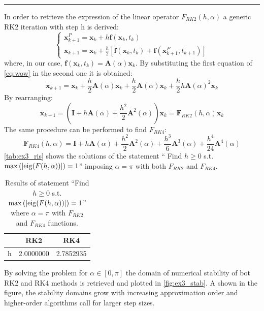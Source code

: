 \documentclass[11pt,a4paper,oneside]{article}
\renewcommand{\vec}[1]{\mathbf{#1}}
\begin{document}
\medskip \hrule \medskip

In order to retrieve the expression of the linear operator $F_{RK2}(h,\alpha)$ a generic RK2 iteration with step h is derived:
\begin{equation}
    \begin{cases}
        \vec{x}_{k+1}^P = \vec{x}_k + h\vec{f}(\vec{x}_k, t_k)\\
        \vec{x}_{k+1} = \vec{x}_k + \frac{h}{2}[\vec{f}(\vec{x}_k,t_k)+\vec{f}(\vec{x}_{k+1}^P, t_{k+1})]
    \end{cases}
    \label{eq:wow}
\end{equation}
where, in our case, $\vec{f}(\vec{x}_k, t_k) = \vec{A}(\alpha)\vec{x}_k$. By substituting the 
first equation of \autoref{eq:wow} in the second one it is obtained:
\begin{equation}
    \vec{x}_{k+1} = \vec{x}_k + \frac{h}{2}\vec{A}(\alpha)\vec{x}_k + \frac{h}{2}\vec{A}(\alpha)\vec{x}_k + \frac{h}{2}h\vec{A}(\alpha)^2\vec{x}_k
\end{equation}
By rearranging:
\begin{equation}
    \vec{x}_{k+1} = (\vec{I} + h\vec{A}(\alpha) + \frac{h^2}{2}\vec{A}^2(\alpha))\vec{x}_k = \vec{F}_{RK2}(h,\alpha)\vec{x}_k
\end{equation}
The same procedure can be performed to find $F_{RK4}$:
\begin{equation}
    \vec{F}_{RK4}(h,\alpha) = \vec{I} + h\vec{A}(\alpha) + \frac{h^2}{2}\vec{A}^2(\alpha) +  \frac{h^3}{6}\vec{A}^3(\alpha) + \frac{h^4}{24}\vec{A}^4(\alpha)
\end{equation}
\autoref{tab:ex3_ris} shows the solutions of the statement ``
Find $h\ge 0$ s.t.$\max\left(|{\rm eig}(F(h,\alpha))|\right) = 1$'' 
imposing $\alpha=\pi$ with both $F_{RK2}$ and $F_{RK4}$.
\begin{table}[h]
    \centering
    \begin{tabular}{l | c c}
         & $\vec{RK2}$ &  $\vec{RK4}$\\
        \midrule \midrule
        h & 2.0000000 & 2.7852935
    \end{tabular}
    \caption{Results of statement ``Find $h\ge 0$ s.t.$\max\left(|{\rm eig}(F(h,\alpha))|\right) = 1$'' where  $\alpha=\pi$ with $F_{RK2}$ and $F_{RK4}$ functions.}
    \label{tab:ex3_ris}
\end{table}

By solving the problem for $\alpha\in[0, \pi]$ the domain of numerical stability of bot RK2 
and RK4 methods is retrieved and plotted in \autoref{fig:ex3_stab}. A shown in the figure, 
the stability domains grow with increasing approximation order and higher-order algorithms 
call for larger step sizes.
\end{document}

